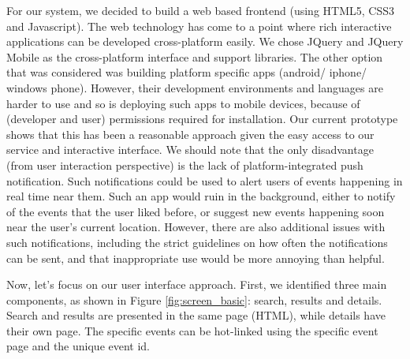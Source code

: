 \documentclass{acm_proc_article-sp}
\begin{document}
For our system, we decided to build a web based frontend (using HTML5, CSS3 and Javascript).
The web technology has come to a point where rich interactive applications can be developed cross-platform easily.
We chose JQuery and JQuery Mobile as the cross-platform interface and support libraries.
The other option that was considered was building platform specific apps (android/ iphone/ windows phone).
However, their development environments and languages are harder to use and so is deploying such apps to mobile devices, 
  because of (developer and user) permissions required for installation.
Our current prototype shows that this has been a reasonable approach given the easy access to our service and interactive interface.
We should note that the only disadvantage (from user interaction perspective) is the lack of platform-integrated push notification.
Such notifications could be used to alert users of events happening in real time near them.
Such an app would ruin in the background, either to notify of the events that the user liked before, or suggest new events happening soon near the user's current location.
However, there are also additional issues with such notifications, including the strict guidelines on how often the notifications can be sent, and that inappropriate use would be more annoying than helpful.

Now, let's focus on our user interface approach.
First, we identified three main components, as shown in Figure \ref{fig:screen_basic}: search, results and details.
Search and results are presented in the same page (HTML), while details have their own page.
The specific events can be hot-linked using the specific event page and the unique event id.

\begin{figure*}
\centering 
{}
\caption{\label{fig:screen_basic}User interface is divided into 3 main sections shown above: Search, Results and Details}
\end{figure*}
\end{document}
